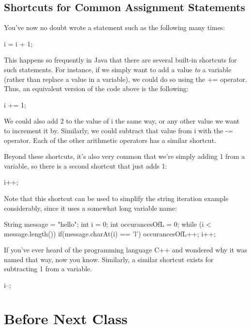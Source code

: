 \subsection{Shortcuts for Common Assignment Statements}

You've now no doubt wrote a statement such as the following many times:

\begin{code}
i = i + 1;
\end{code}

This happens so frequently in Java that there are several built-in shortcuts for such statements. 
For instance, if we simply want to add a value \textit{to} a variable (rather than replace a value in a variable), we could do so using the += operator. Thus, an equivalent version of the code above is the following:

\begin{code}
i += 1;
\end{code}

We could also add 2 to the value of i the same way, or any other value we want to increment it by. Similarly, we could subtract that value from i with the -= operator. Each of the other arithmetic operators has a similar shortcut. 

Beyond these shortcuts, it's also very common that we're simply adding 1 from a variable, so there is a second shortcut that just adds 1:

\begin{code}
i++;
\end{code}


Note that this shortcut can be used to simplify the string iteration example considerably, since it uses a somewhat long variable name:

\begin{code}
String message = "hello";
int i = 0;
int occurancesOfL = 0;
while (i < message.length()) {
  if(message.charAt(i) == 'l') {
    occurancesOfL++;
  }
  i++;
}
\end{code}


If you've ever heard of the programming language C++ and wondered why it was named that way, now you know. Similarly, a similar shortcut exists for subtracting 1 from a variable. 


\begin{code}
i--;
\end{code}



\section{Before Next Class}


